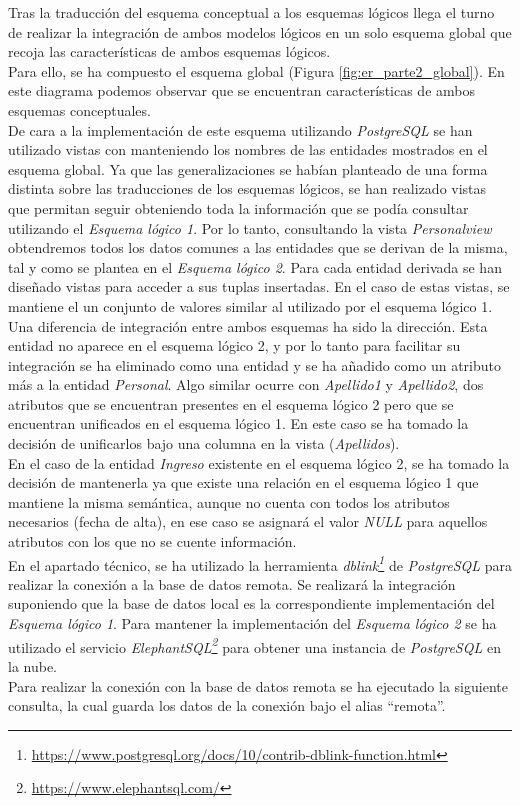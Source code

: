 \documentclass{article}
\begin{document}
Tras la traducción del esquema conceptual a los esquemas lógicos llega el turno de realizar la integración de ambos modelos lógicos en un solo esquema global que recoja las características de ambos esquemas lógicos.\\
Para ello, se ha compuesto el esquema global (Figura \ref{fig:er_parte2_global}). En este diagrama podemos observar que se encuentran características de ambos esquemas conceptuales. \\
De cara a la implementación de este esquema utilizando \emph{PostgreSQL} se han utilizado vistas con manteniendo los nombres de las entidades mostrados en el esquema global. Ya que las generalizaciones se habían planteado de una forma distinta sobre las traducciones de los esquemas lógicos, se han realizado vistas que permitan seguir obteniendo toda la información que se podía consultar utilizando el \emph{Esquema lógico 1}. Por lo tanto, consultando la vista \emph{Personalview} obtendremos todos los datos comunes a las entidades que se derivan de la misma, tal y como se plantea en el \emph{Esquema lógico 2}. Para cada entidad derivada se han diseñado vistas para acceder a sus tuplas insertadas. En el caso de estas vistas, se mantiene el un conjunto de valores similar al utilizado por el esquema lógico 1.\\
Una diferencia de integración entre ambos esquemas ha sido la dirección. Esta entidad no aparece en el esquema lógico 2, y por lo tanto para facilitar su integración se ha eliminado como una entidad y se ha añadido como un atributo más a la entidad \emph{Personal}. Algo similar ocurre con \emph{Apellido1} y \emph{Apellido2}, dos atributos que se encuentran presentes en el esquema lógico 2 pero que se encuentran unificados en el esquema lógico 1. En este caso se ha tomado la decisión de unificarlos bajo una columna en la vista (\emph{Apellidos}).\\
En el caso de la entidad \emph{Ingreso} existente en el esquema lógico 2, se ha tomado la decisión de mantenerla ya que existe una relación en el esquema lógico 1 que mantiene la misma semántica, aunque no cuenta con todos los atributos necesarios (fecha de alta), en ese caso se asignará el valor \emph{NULL} para aquellos atributos con los que no se cuente información.\\

En el apartado técnico, se ha utilizado la herramienta \emph{dblink\footnote{\url{https://www.postgresql.org/docs/10/contrib-dblink-function.html}}} de \emph{PostgreSQL} para realizar la conexión a la base de datos remota. Se realizará la integración suponiendo que la base de datos local es la correspondiente implementación del \emph{Esquema lógico 1}. Para mantener la implementación del \emph{Esquema lógico 2} se ha utilizado el servicio \emph{ElephantSQL\footnote{\url{https://www.elephantsql.com/}}} para obtener una instancia de \emph{PostgreSQL} en la nube.\\
Para realizar la conexión con la base de datos remota se ha ejecutado la siguiente consulta, la cual guarda los datos de la conexión bajo el alias ``remota''.
\end{document}
